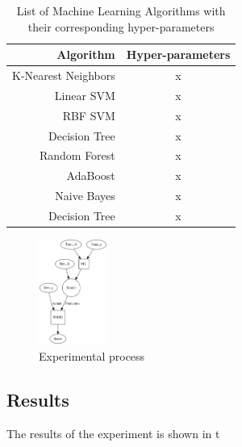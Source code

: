 \documentclass{article}
\begin{document}
	\begin{table}[h]
  		\begin{center}
   			\begin{tabular}{ | r | c |}
	    		\hline
			Algorithm & Hyper-parameters \\ \hline\hline
			K-Nearest Neighbors        & x \\ \hline
			Linear SVM                 & x \\ \hline
			RBF SVM                    & x \\ \hline
			Decision Tree              & x \\ \hline
			Random Forest              & x \\ \hline
			AdaBoost                   & x \\ \hline
			Naive Bayes                & x \\ \hline
			Decision Tree              & x \\ \hline
			\end{tabular}
		\end{center}
		\caption{List of Machine Learning Algorithms with their corresponding hyper-parameters}
		\label{list_mls}
	\end{table}

	\begin{figure} [h]
 		\begin{center}
		\includegraphics[width=0.20\textwidth]{process}
  		\end{center}
  		\caption{Experimental process}
  		\label{process}
 	\end{figure}

	\subsection{Results}
	The results of the experiment is shown in t
\end{document}
